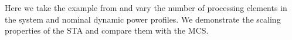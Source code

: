 Here we take the example from  and vary the number of processing elements in the system and nominal dynamic power profiles. We demonstrate the scaling properties of the STA and compare them with the MCS.
